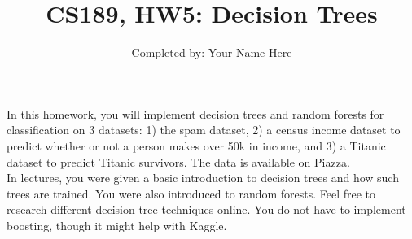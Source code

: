 \documentclass{article}
\title{CS189, HW5: Decision Trees}
\author{ Completed by: Your Name Here}
\date{}
\begin{document}
\maketitle

\noindent In this homework, you will implement decision trees and random forests for classification on 3 datasets: 1) the spam dataset, 2) a census income dataset to predict whether or not a person makes over 50k in income, and 3) a Titanic dataset to predict Titanic survivors. The data is available on Piazza. \\

\noindent In lectures, you were given a basic introduction to decision trees and how such trees are trained. You were also introduced to random forests. Feel free to research different decision tree techniques online. You do not have to implement boosting, though it might help with Kaggle.
\end{document}

